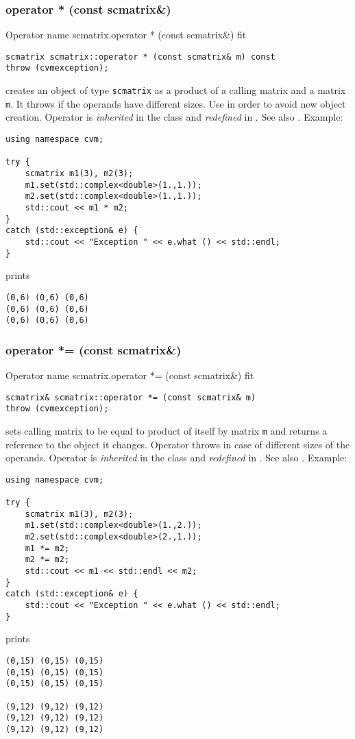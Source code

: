 \subsubsection{operator * (const scmatrix\&)}
Operator%
\pdfdest name {scmatrix.operator * (const scmatrix&)} fit
\begin{verbatim}
scmatrix scmatrix::operator * (const scmatrix& m) const
throw (cvmexception);
\end{verbatim}
creates an object of type \verb"scmatrix"
as a product of a calling matrix and a matrix \verb"m".
It throws  
if the operands have different sizes.
Use  in order to avoid
 new object creation.
Operator is \emph{inherited} in the class
and \emph{redefined} in .
See also
.
Example:
\begin{Verbatim}
using namespace cvm;

try {
    scmatrix m1(3), m2(3);
    m1.set(std::complex<double>(1.,1.));
    m2.set(std::complex<double>(1.,1.));
    std::cout << m1 * m2;
}
catch (std::exception& e) {
    std::cout << "Exception " << e.what () << std::endl;
}
\end{Verbatim}
prints
\begin{Verbatim}
(0,6) (0,6) (0,6)
(0,6) (0,6) (0,6)
(0,6) (0,6) (0,6)
\end{Verbatim}
\newpage




\subsubsection{operator *= (const scmatrix\&)}
Operator%
\pdfdest name {scmatrix.operator *= (const scmatrix&)} fit
\begin{verbatim}
scmatrix& scmatrix::operator *= (const scmatrix& m)
throw (cvmexception);
\end{verbatim}
sets  calling matrix to be equal to  product
of itself by  matrix \verb"m"
and returns a reference to
the object it changes.
Operator throws 
in case of different sizes of the operands.
Operator is \emph{inherited} in the class
and \emph{redefined} in .
See also .
Example:
\begin{Verbatim}
using namespace cvm;

try {
    scmatrix m1(3), m2(3);
    m1.set(std::complex<double>(1.,2.));
    m2.set(std::complex<double>(2.,1.));
    m1 *= m2;
    m2 *= m2;
    std::cout << m1 << std::endl << m2;
}
catch (std::exception& e) {
    std::cout << "Exception " << e.what () << std::endl;
}
\end{Verbatim}
prints
\begin{Verbatim}
(0,15) (0,15) (0,15)
(0,15) (0,15) (0,15)
(0,15) (0,15) (0,15)

(9,12) (9,12) (9,12)
(9,12) (9,12) (9,12)
(9,12) (9,12) (9,12)
\end{Verbatim}
\newpage



